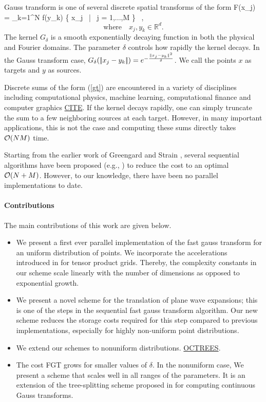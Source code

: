 Gauss transform is one of several discrete spatial transforms of the form 
%
\beq F(x_j) = \sum_{k=1}^N  f(y_k) \quad {} \quad \{ x_j \, | \, j = 1,...,M \} \, , \label{gt} \eeq
\[\text{where} \quad x_j, y_k \in \mathbb{R}^d. \]
%
The kernel $G_\delta$ is a smooth exponentially decaying function in both the physical
and Fourier domains. The parameter $\delta$ controls how rapidly the kernel decays.  
In the Gauss transform case, $G_\delta (|\!| x_j - y_k |\!|) = e^{-\frac{\|x_j - y_k\|^2}{\delta}}$.  We call the
points $x$ as targets and $y$ as sources.  

Discrete sums of the form (\ref{gt}) are encountered in a variety of disciplines including computational physics,
 machine learning, computational finance and computer graphics \ul{CITE}. If the kernel decays rapidly, one can
  simply truncate the sum to a few neighboring sources at each target. However, in many important applications, this 
  is not the case and computing these sums directly takes $\mathcal{O}(NM)$ time. 

Starting from the earlier work of Greengard and Strain \cite{fgt}, several sequential algorithms have 
been proposed (e.g.,  \cite{greengard98, duraiswami03, tausch09, fggt}) to reduce the 
cost to an optimal $\mathcal{O}(N+M)$. However, to our knowledge, there have been no parallel implementations to date. 

\paragraph{Contributions} The main contributions of this work are given below.
\begin{itemize} 
%
\item We present a first ever parallel implementation of the fast gauss transform for an 
uniform distribution of points. We incorporate the accelerations introduced in \cite{fggt} for tensor product grids. 
Thereby, the complexity constants in our scheme scale linearly with the number of dimensions 
as opposed to exponential growth. 
%
\item We present a novel scheme for the translation of plane wave expansions; this is one
of the steps in the sequential fast gauss transform algorithm. Our new scheme reduces the 
 storage costs required for this step compared to previous implementations, especially for highly
non-uniform point distributions.
%
\item We extend our schemes to nonuniform distributions. \ul{OCTREES}.

\item The cost FGT grows for smaller values of $\delta$. In the nonuniform case, 
We present a scheme that scales well in all ranges of the parameters. It is an extension of the tree-splitting scheme 
proposed in \cite{veerapaneni08} for computing continuous Gauss transforms. 
%
\end{itemize}

